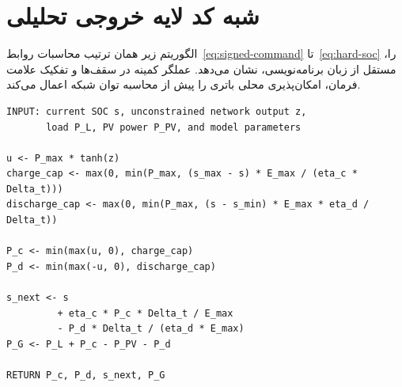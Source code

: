 \chapter{شبه کد لایه خروجی تحلیلی}
\label{app:hard-layer}

الگوریتم زیر همان ترتیب محاسبات روابط~\eqref{eq:signed-command} تا~\eqref{eq:hard-soc} را، مستقل از زبان برنامه‌نویسی، نشان می‌دهد. عملگر کمینه در سقف‌ها و تفکیک علامت فرمان، امکان‌پذیری محلی باتری را پیش از محاسبه توان شبکه اعمال می‌کند.

\begin{lstlisting}[style=bonabcode,caption={شبه‌کد لایه خروجی با قید سخت},label={lst:hard-layer}]
INPUT: current SOC s, unconstrained network output z,
       load P_L, PV power P_PV, and model parameters

u <- P_max * tanh(z)
charge_cap <- max(0, min(P_max, (s_max - s) * E_max / (eta_c * Delta_t)))
discharge_cap <- max(0, min(P_max, (s - s_min) * E_max * eta_d / Delta_t))

P_c <- min(max(u, 0), charge_cap)
P_d <- min(max(-u, 0), discharge_cap)

s_next <- s
         + eta_c * P_c * Delta_t / E_max
         - P_d * Delta_t / (eta_d * E_max)
P_G <- P_L + P_c - P_PV - P_d

RETURN P_c, P_d, s_next, P_G
\end{lstlisting}
